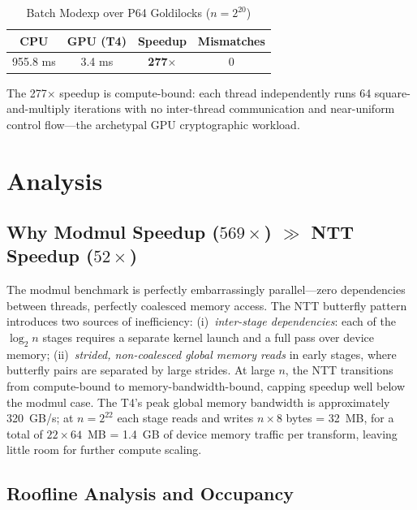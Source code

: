 \documentclass[conference]{IEEEtran}
\begin{document}
\begin{table}[t]
\caption{Batch Modexp over P64 Goldilocks ($n = 2^{20}$)}
\label{tab:modexp}
\begin{center}
\begin{tabular}{|c|c|c|c|}
\hline
\textbf{CPU} & \textbf{GPU (T4)} & \textbf{Speedup} & \textbf{Mismatches} \\
\hline
955.8 ms & 3.4 ms & \textbf{277$\times$} & 0 \\
\hline
\end{tabular}
\end{center}
\end{table}

The 277$\times$ speedup is compute-bound: each thread independently runs 64
square-and-multiply iterations with no inter-thread communication and
near-uniform control flow---the archetypal GPU cryptographic workload.

\section{Analysis}

\subsection{Why Modmul Speedup ($569\times$) $\gg$ NTT Speedup ($52\times$)}\label{sec:bw}

The modmul benchmark is perfectly embarrassingly parallel---zero dependencies
between threads, perfectly coalesced memory access. The NTT butterfly pattern
introduces two sources of inefficiency: (i)~\emph{inter-stage dependencies}:
each of the $\log_2 n$ stages requires a separate kernel launch and a full pass
over device memory; (ii)~\emph{strided, non-coalesced global memory reads} in
early stages, where butterfly pairs are separated by large strides. At large $n$, the NTT transitions from compute-bound to
memory-bandwidth-bound, capping speedup well below the modmul case. The T4's
peak global memory bandwidth is approximately 320~GB/s; at $n=2^{22}$ each
stage reads and writes $n \times 8$ bytes = 32~MB, for a total of
$22 \times 64$~MB = 1.4~GB of device memory traffic per transform, leaving
little room for further compute scaling.

\subsection{Roofline Analysis and Occupancy}
\end{document}
